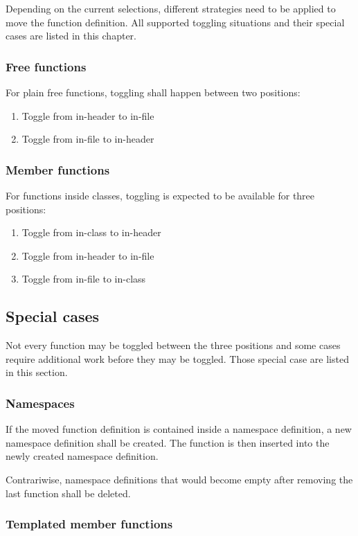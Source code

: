 Depending on the current selections, different strategies need to be applied to 
move the function definition. All supported toggling situations and their 
special cases are listed in this chapter.

\subsubsection{Free functions}
For plain free functions, toggling shall happen between two positions:
\begin{enumerate}
\item Toggle from in-header to in-file
\item Toggle from in-file to in-header
\end{enumerate}

\subsubsection{Member functions}
For functions inside classes, toggling is expected to be available for three 
positions:
\begin{enumerate}
\item Toggle from in-class to in-header
\item Toggle from in-header to in-file
\item Toggle from in-file to in-class
\end{enumerate}

\subsection{Special cases}

Not every function may be toggled between the three positions and some cases 
require additional work before they may be toggled. Those special case are 
listed in this section.

\subsubsection{Namespaces}

If the moved function definition is contained inside a namespace definition, a 
new namespace definition shall be created. The function is then inserted into 
the newly created namespace definition.

Contrariwise, namespace definitions that would become empty after removing the 
last function shall be deleted.

\subsubsection{Templated member functions}

